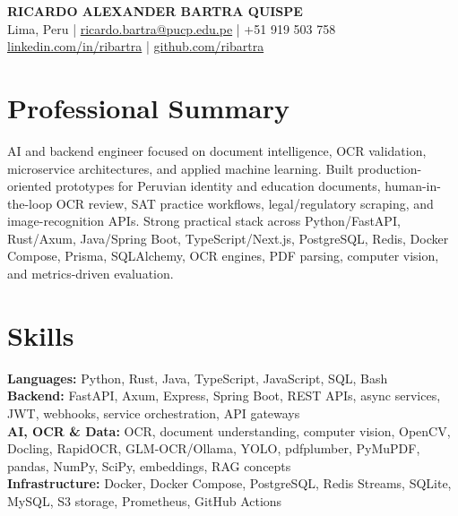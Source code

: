 \documentclass[10pt,letterpaper]{article}
\begin{document}

\begin{center}
    {\LARGE \textbf{RICARDO ALEXANDER BARTRA QUISPE}} \\[3pt]
    Lima, Peru \;|\; \href{mailto:ricardo.bartra@pucp.edu.pe}{ricardo.bartra@pucp.edu.pe} \;|\; +51 919 503 758 \\
    \href{https://www.linkedin.com/in/ribartra}{linkedin.com/in/ribartra} \;|\;
    \href{https://github.com/ribartra}{github.com/ribartra}
\end{center}


\section{Professional Summary}

AI and backend engineer focused on document intelligence, OCR validation, microservice architectures, and applied machine learning. Built production-oriented prototypes for Peruvian identity and education documents, human-in-the-loop OCR review, SAT practice workflows, legal/regulatory scraping, and image-recognition APIs. Strong practical stack across Python/FastAPI, Rust/Axum, Java/Spring Boot, TypeScript/Next.js, PostgreSQL, Redis, Docker Compose, Prisma, SQLAlchemy, OCR engines, PDF parsing, computer vision, and metrics-driven evaluation.


\section{Skills}

\textbf{Languages:} Python, Rust, Java, TypeScript, JavaScript, SQL, Bash \\

\textbf{Backend:} FastAPI, Axum, Express, Spring Boot, REST APIs, async services, JWT, webhooks, service orchestration, API gateways \\

\textbf{AI, OCR \& Data:} OCR, document understanding, computer vision, OpenCV, Docling, RapidOCR, GLM-OCR/Ollama, YOLO, pdfplumber, PyMuPDF, pandas, NumPy, SciPy, embeddings, RAG concepts \\

\textbf{Infrastructure:} Docker, Docker Compose, PostgreSQL, Redis Streams, SQLite, MySQL, S3 storage, Prometheus, GitHub Actions \\
\end{document}

